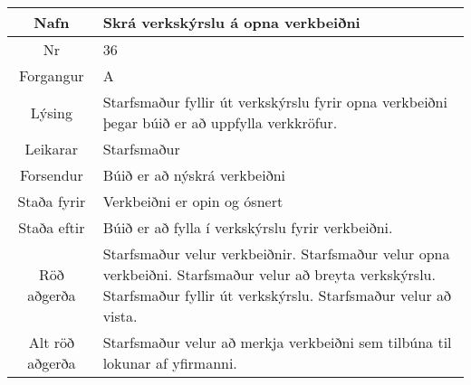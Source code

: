 \documentclass[a4paper]{article}
\begin{document}
\begin{tabular}{|c|p{10cm}|}
\hline
Nafn&Skrá verkskýrslu á opna verkbeiðni\\
\hline
Nr&36\\
\hline
Forgangur&A\\
\hline
Lýsing&Starfsmaður fyllir út verkskýrslu fyrir opna verkbeiðni þegar búið er að uppfylla verkkröfur.\\
\hline
Leikarar&Starfsmaður\\
\hline
Forsendur&Búið er að nýskrá verkbeiðni\\
\hline
Staða fyrir&Verkbeiðni er opin og ósnert\\
\hline
Staða eftir&Búið er að fylla í verkskýrslu fyrir verkbeiðni.\\
\hline
Röð aðgerða&Starfsmaður velur verkbeiðnir. Starfsmaður velur opna verkbeiðni. Starfsmaður velur að breyta verkskýrslu. Starfsmaður fyllir út verkskýrslu. Starfsmaður velur að vista.\\
\hline
Alt röð aðgerða&Starfsmaður velur að merkja verkbeiðni sem tilbúna til lokunar af yfirmanni.\\
\hline
\end{tabular}
\end{document}
